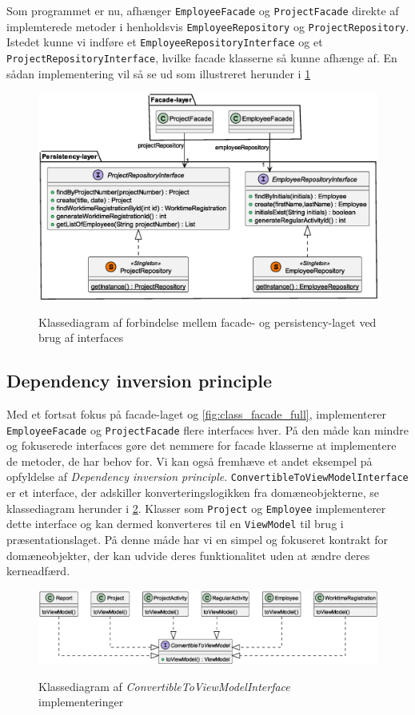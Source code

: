 Som programmet er nu, afhænger \texttt{EmployeeFacade} og \texttt{ProjectFacade} direkte af implemterede metoder i henholdsvis \texttt{EmployeeRepository} og \texttt{ProjectRepository}. Istedet kunne vi indføre et \texttt{EmployeeRepositoryInterface} og et \texttt{ProjectRepositoryInterface}, hvilke facade klasserne så kunne afhænge af. En sådan implementering vil så se ud som illustreret herunder i \cref{fig:class_facade_persistency_improved}
\begin{figure}[H]
  \centering
  \caption{Klassediagram af forbindelse mellem facade- og persistency-laget ved brug af interfaces}
  \includegraphics[width = 12cm]{ImplementationAndTest/Diagrams/ClassDiagrams/persistency_to_facade_example_improved.eps}
  \label{fig:class_facade_persistency_improved}
\end{figure}
\subsection{Dependency inversion principle} \label{sec:solid_d}
Med et fortsat fokus på facade-laget og \cref{fig:class_facade_full}, implementerer \texttt{EmployeeFacade} og \texttt{ProjectFacade} flere interfaces hver. På den måde kan mindre og fokuserede interfaces gøre det nemmere for facade klasserne at implementere de metoder, de har behov for.\newline
Vi kan også fremhæve et andet eksempel på opfyldelse af \textit{Dependency inversion principle}. \texttt{ConvertibleToViewModelInterface} er et interface, der adskiller konverteringslogikken fra domæneobjekterne, se klassediagram herunder i \cref{fig:class_convertible_example}. Klasser som \texttt{Project} og \texttt{Employee} implementerer dette interface og kan dermed konverteres til en \texttt{ViewModel} til brug i præsentationslaget. På denne måde har vi en simpel og fokuseret kontrakt for domæneobjekter, der kan udvide deres funktionalitet uden at ændre deres kerneadfærd.
\begin{figure}[H]
  \centering
  \caption{Klassediagram af \textit{ConvertibleToViewModelInterface} implementeringer}
  \includegraphics[width = \textwidth]{ImplementationAndTest/Diagrams/ClassDiagrams/ConvertibleToViewModel_diagram.eps}
  \label{fig:class_convertible_example}
\end{figure}